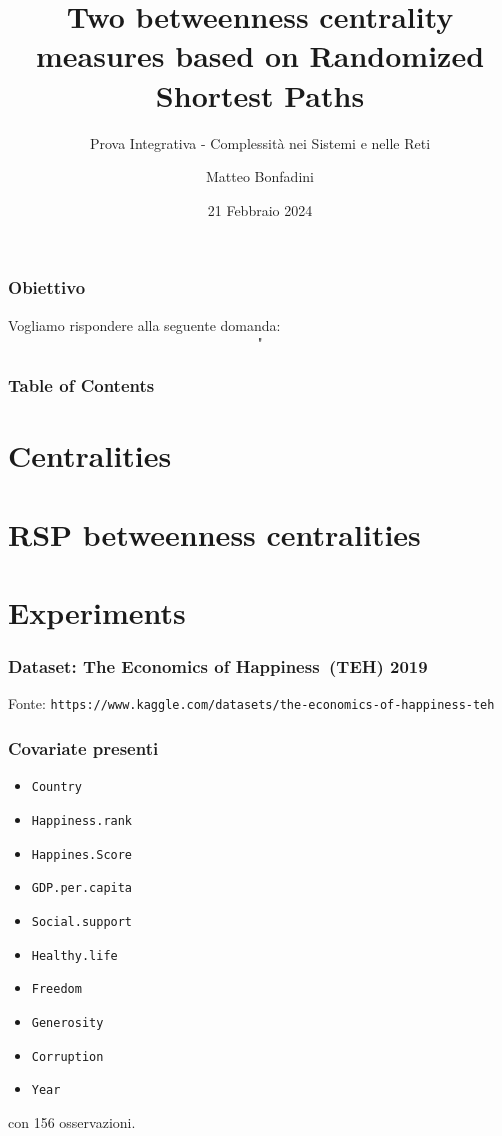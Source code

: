 \documentclass{beamer}
\title{Two betweenness centrality
measures based on Randomized
Shortest Paths}
\subtitle{Prova Integrativa - Complessità nei Sistemi e nelle Reti}
\author{Matteo Bonfadini}
\institute{Politecnico di Milano}
\date{21 Febbraio 2024}
\begin{document}
\frame{\titlepage}

\begin{frame}
    \frametitle{Obiettivo}
    Vogliamo rispondere alla seguente domanda:
    \begin{gather*}
    \text{"}
    \end{gather*}
\end{frame}

\begin{frame}
    \frametitle{Table of Contents}
    \tableofcontents
\end{frame}

\section{Centralities}

\section{RSP betweenness centralities}

\section{Experiments}



\begin{frame}
    \frametitle{Dataset: The Economics of Happiness (TEH) 2019}
    Fonte: 
    \smallskip
    \footnotesize{\texttt{https://www.kaggle.com/datasets/the-economics-of-happiness-teh}}
\end{frame}

\begin{frame}
    \frametitle{Covariate presenti}
	\begin{itemize}
	\item \texttt{Country}
	\item \texttt{Happiness.rank}
	\item \texttt{Happines.Score}
	\item \texttt{GDP.per.capita}
	\item \texttt{Social.support}
	\item \texttt{Healthy.life}
	\item \texttt{Freedom}
	\item \texttt{Generosity}
	\item \texttt{Corruption}
	\item \texttt{Year}
	\end{itemize}
	con 156 osservazioni.
\end{frame}
\end{document}
